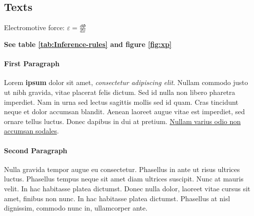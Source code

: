 \subsection{Texts}

Electromotive force:
\begin{math}
\varepsilon =  \frac{d \Phi}{dx}
\end{math}

\vspace{0.2cm}

\textbf{See table \ref{tab:Inference-rules} and figure \ref{fig:xp}}

\paragraph{First Paragraph}
Lorem \textbf{ipsum} dolor sit amet, \textit{consectetur adipiscing \emph{elit}}. Nullam commodo justo ut nibh gravida, vitae placerat felis dictum. Sed id nulla non libero pharetra imperdiet. Nam in urna sed lectus sagittis mollis sed id quam. Cras tincidunt neque et dolor accumsan blandit. Aenean laoreet augue vitae est imperdiet, sed ornare tellus luctus. Donec dapibus in dui at pretium. \underline{Nullam varius odio non accumsan sodales}.

\paragraph{Second Paragraph}
 Nulla gravida tempor augue eu consectetur. Phasellus in ante ut risus ultrices luctus. Phasellus tempus neque sit amet diam ultrices suscipit. Nunc at mauris velit. In hac habitasse platea dictumst. Donec nulla dolor, laoreet vitae cursus sit amet, finibus non nunc. In hac habitasse platea dictumst. Phasellus at nisl dignissim, commodo nunc in, ullamcorper ante.
